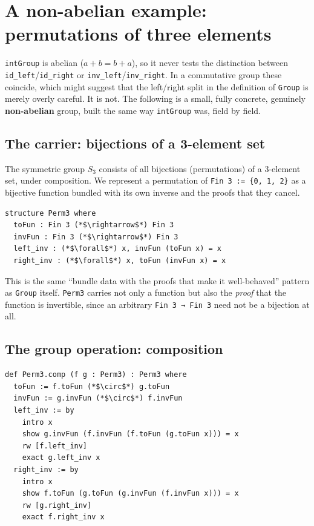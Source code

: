 \section{A non-abelian example: permutations of three elements}\label{sec:06-groups:04-permutations-example:1}

\texttt{intGroup} is abelian (\(a + b = b + a\)), so it never tests the distinction between \texttt{id\_\allowbreak{}left}/\texttt{id\_\allowbreak{}right} or \texttt{inv\_\allowbreak{}left}/\texttt{inv\_\allowbreak{}right}. In a commutative group these coincide, which might suggest that the left/right split in the definition of \texttt{Group} is merely overly careful. It is not. The following is a small, fully concrete, genuinely \textbf{non-abelian} group, built the same way \texttt{intGroup} was, field by field.

\subsection{The carrier: bijections of a 3-element set}\label{sec:06-groups:04-permutations-example:2}

The symmetric group \(S_3\) consists of all bijections (permutations) of a 3-element set, under composition. We represent a permutation of \texttt{Fin 3 := \{0, 1, 2\}} as a bijective function bundled with its own inverse and the proofs that they cancel.

\begin{lstlisting}
structure Perm3 where
  toFun : Fin 3 (*$\rightarrow$*) Fin 3
  invFun : Fin 3 (*$\rightarrow$*) Fin 3
  left_inv : (*$\forall$*) x, invFun (toFun x) = x
  right_inv : (*$\forall$*) x, toFun (invFun x) = x
\end{lstlisting}

This is the same ``bundle data with the proofs that make it well-behaved'' pattern as \texttt{Group} itself. \texttt{Perm3} carries not only a function but also the \emph{proof} that the function is invertible, since an arbitrary \texttt{Fin 3 → Fin 3} need not be a bijection at all.

\subsection{The group operation: composition}\label{sec:06-groups:04-permutations-example:3}

\begin{lstlisting}
def Perm3.comp (f g : Perm3) : Perm3 where
  toFun := f.toFun (*$\circ$*) g.toFun
  invFun := g.invFun (*$\circ$*) f.invFun
  left_inv := by
    intro x
    show g.invFun (f.invFun (f.toFun (g.toFun x))) = x
    rw [f.left_inv]
    exact g.left_inv x
  right_inv := by
    intro x
    show f.toFun (g.toFun (g.invFun (f.invFun x))) = x
    rw [g.right_inv]
    exact f.right_inv x
\end{lstlisting}

